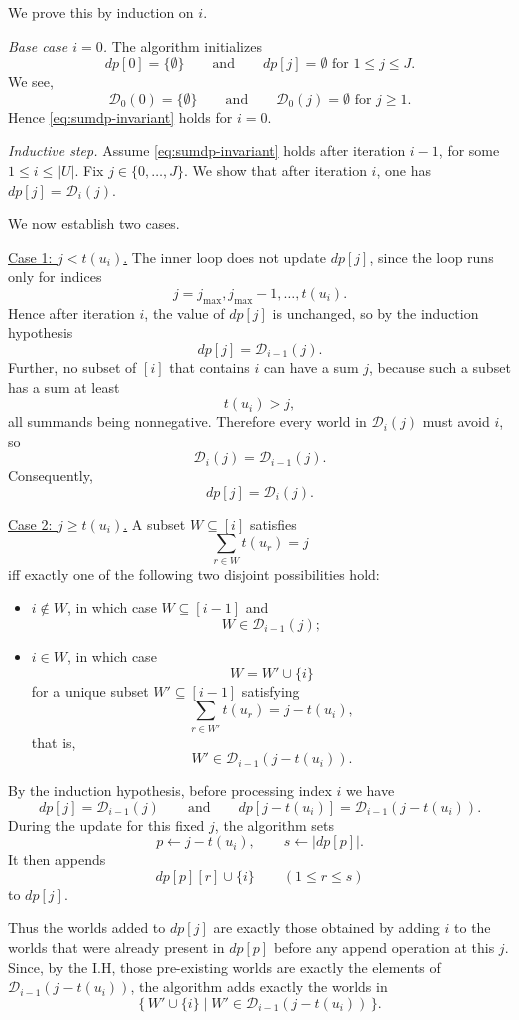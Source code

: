 \begin{appendixproof}
We prove this by induction on $i$.

\smallskip\noindent\emph{Base case $i=0$.}
The algorithm initializes
\[
dp[0]=\{\emptyset\}
\qquad\text{and}\qquad
dp[j]=\emptyset \text{ for } 1\le j\le J.
\]
We see,
\[
\mathcal D_0(0)=\{\emptyset\}
\qquad\text{and}\qquad
\mathcal D_0(j)=\emptyset \text{ for } j\ge 1.
\]
Hence \eqref{eq:sumdp-invariant} holds for $i=0$.

\smallskip\noindent\emph{Inductive step.}
Assume \eqref{eq:sumdp-invariant} holds after iteration $i-1$, for some $1\le i\le |U|$.
Fix $j\in\{0,\dots,J\}$.
We show that after iteration $i$, one has $dp[j]=\mathcal D_i(j)$.

We now establish two cases.

\smallskip\noindent\underline{Case 1: $j<t(u_i)$.}
The inner loop does not update $dp[j]$, since the loop runs only for indices
\[
  j=j_{\max},j_{\max}-1,\dots,t(u_i).
\]
Hence after iteration $i$, the value of $dp[j]$ is unchanged, so by the induction hypothesis
\[
dp[j]=\mathcal D_{i-1}(j).
\]
Further, no subset of $[i]$ that contains $i$ can have a sum $j$, because such a subset has a sum at least
\[
  t(u_i)>j,
\]
all summands being nonnegative. Therefore every world in $\mathcal D_i(j)$ must avoid $i$, so
\[
\mathcal D_i(j)=\mathcal D_{i-1}(j).
\]
Consequently,
\[
dp[j]=\mathcal D_i(j).
\]

\smallskip\noindent\underline{Case 2: $j\ge t(u_i)$.}
A subset $W\subseteq [i]$ satisfies
\[
  \sum_{r\in W} t(u_r)=j
\]
iff exactly one of the following two disjoint possibilities hold:
\begin{itemize}
  \item $i\notin W$, in which case $W\subseteq [i-1]$ and
\[
W\in \mathcal D_{i-1}(j);
\]
\item $i\in W$, in which case
\[
W=W'\cup\{i\}
\]
for a unique subset $W'\subseteq [i-1]$ satisfying
\[
  \sum_{r\in W'} t(u_r)=j-t(u_i),
\]
that is,
\[
  W'\in \mathcal D_{i-1}(j-t(u_i)).
\]
\end{itemize}

By the induction hypothesis, before processing index $i$ we have
\[
dp[j]=\mathcal D_{i-1}(j)
\qquad\text{and}\qquad
dp[j-t(u_i)]=\mathcal D_{i-1}(j-t(u_i)).
\]
During the update for this fixed $j$, the algorithm sets
\[
  p\gets j-t(u_i),
\qquad
s\gets |dp[p]|.
\]
It then appends
\[
dp[p][r]\cup\{i\}
\qquad (1\le r\le s)
\]
to $dp[j]$.

Thus the worlds added to $dp[j]$ are exactly those obtained by adding $i$ to the worlds that were already present in $dp[p]$ before any append operation at this $j$.
Since, by the I.H, those pre-existing worlds are exactly the elements of $\mathcal D_{i-1}(j-t(u_i))$, the algorithm adds exactly the worlds in
\[
  \{\,W'\cup\{i\}\mid W'\in \mathcal D_{i-1}(j-t(u_i))\,\}.
\]


\end{appendixproof}
